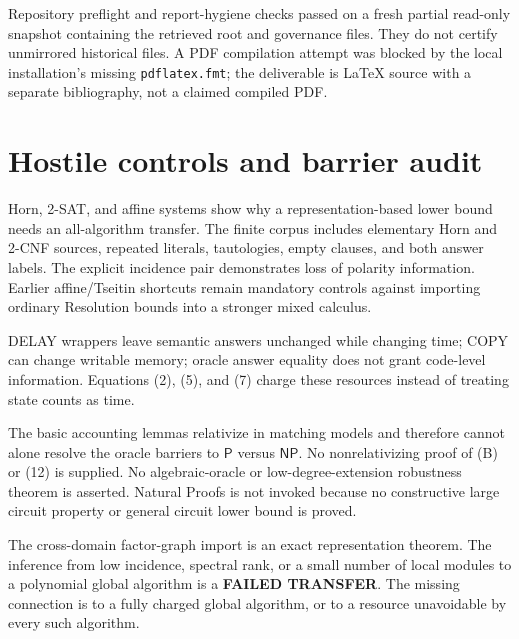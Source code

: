 \documentclass[11pt]{article}
\newcommand{\Pclass}{\mathsf P}
\newcommand{\NP}{\mathsf{NP}}
\begin{document}
Repository preflight and report-hygiene checks passed on a fresh partial
read-only snapshot containing the retrieved root and governance files.
They do not certify unmirrored historical files. A PDF compilation attempt
was blocked by the local installation's missing \texttt{pdflatex.fmt};
the deliverable is LaTeX source with a separate bibliography, not a
claimed compiled PDF.

\section*{Hostile controls and barrier audit}
Horn, 2-SAT, and affine systems show why a representation-based lower
bound needs an all-algorithm transfer. The finite corpus includes elementary
Horn and 2-CNF sources, repeated literals, tautologies, empty clauses, and
both answer labels. The explicit incidence pair demonstrates loss of
polarity information. Earlier affine/Tseitin shortcuts remain mandatory
controls against importing ordinary Resolution bounds into a stronger
mixed calculus.

DELAY wrappers leave semantic answers unchanged while changing time;
COPY can change writable memory; oracle answer equality does not grant
code-level information. Equations (2), (5), and (7) charge these resources
instead of treating state counts as time.

The basic accounting lemmas relativize in matching models and therefore
cannot alone resolve the oracle barriers to $\Pclass$ versus $\NP$.
No nonrelativizing proof of (B) or (12) is supplied.
No algebraic-oracle or low-degree-extension robustness theorem is asserted.
Natural Proofs is not invoked because no constructive large circuit property
or general circuit lower bound is proved.

The cross-domain factor-graph import is an exact representation theorem.
The inference from low incidence, spectral rank, or a small number of local
modules to a polynomial global algorithm is a \textbf{FAILED TRANSFER}.
The missing connection is to a fully charged global algorithm, or to a
resource unavoidable by every such algorithm.
\end{document}
